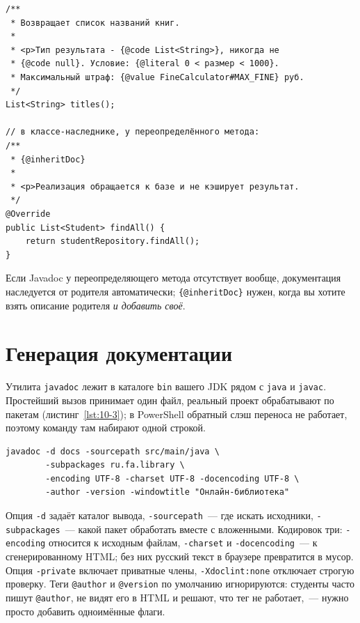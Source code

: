 \begin{listing}[H]
\begin{verbatim}
/**
 * Возвращает список названий книг.
 *
 * <p>Тип результата - {@code List<String>}, никогда не
 * {@code null}. Условие: {@literal 0 < размер < 1000}.
 * Максимальный штраф: {@value FineCalculator#MAX_FINE} руб.
 */
List<String> titles();

// в классе-наследнике, у переопределённого метода:
/**
 * {@inheritDoc}
 *
 * <p>Реализация обращается к базе и не кэширует результат.
 */
@Override
public List<Student> findAll() {
    return studentRepository.findAll();
}
\end{verbatim}
\caption{Строчные дескрипторы и наследование документации}
\label{lst:10-2}
\end{listing}

Если Javadoc у переопределяющего метода отсутствует вообще, документация наследуется от родителя автоматически; \texttt{\{@inheritDoc\}} нужен, когда вы хотите взять описание родителя \emph{и добавить своё}.

\section{Генерация документации}

Утилита \texttt{javadoc} лежит в каталоге \texttt{bin} вашего JDK рядом с \texttt{java} и \texttt{javac}. Простейший вызов принимает один файл, реальный проект обрабатывают по пакетам (листинг~\ref{lst:10-3}); в PowerShell обратный слэш переноса не работает, поэтому команду там набирают одной строкой.

\begin{listing}[H]
\begin{verbatim}
javadoc -d docs -sourcepath src/main/java \
        -subpackages ru.fa.library \
        -encoding UTF-8 -charset UTF-8 -docencoding UTF-8 \
        -author -version -windowtitle "Онлайн-библиотека"
\end{verbatim}
\caption{Вызов утилиты javadoc из командной строки}
\label{lst:10-3}
\end{listing}

Опция \texttt{-d} задаёт каталог вывода, \texttt{-sourcepath}~--- где искать исходники, \texttt{-subpackages}~--- какой пакет обработать вместе с вложенными. Кодировок три: \texttt{-encoding} относится к исходным файлам, \texttt{-charset} и \texttt{-docencoding}~--- к сгенерированному HTML; без них русский текст в браузере превратится в мусор. Опция \texttt{-private} включает приватные члены, \texttt{-Xdoclint:none} отключает строгую проверку. Теги \texttt{@author} и \texttt{@version} по умолчанию игнорируются: студенты часто пишут \texttt{@author}, не видят его в HTML и решают, что тег не работает,~--- нужно просто добавить одноимённые флаги.

